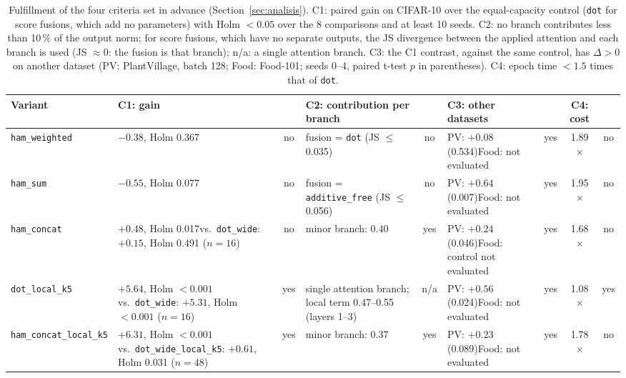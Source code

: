 
\begin{table}[!t]
\centering
\footnotesize
\caption{Fulfillment of the four criteria set in advance (Section~\ref{sec:analisis}). C1: paired gain on CIFAR-10 over the equal-capacity control (\texttt{dot} for score fusions, which add no parameters) with Holm $<0.05$ over the 8 comparisons and at least 10 seeds. C2: no branch contributes less than 10\,\% of the output norm; for score fusions, which have no separate outputs, the JS divergence between the applied attention and each branch is used (JS $\approx0$: the fusion is that branch); n/a: a single attention branch. C3: the C1 contrast, against the same control, has $\Delta>0$ on another dataset (PV: PlantVillage, batch 128; Food: Food-101; seeds 0--4, paired t-test $p$ in parentheses). C4: epoch time $<1.5$ times that of \texttt{dot}.}
\label{tab:criterios}
\begin{adjustbox}{max width=\linewidth}
\begin{tabular}{>{\raggedright\arraybackslash}p{3.25cm}>{\raggedright\arraybackslash}p{3.5cm}c>{\raggedright\arraybackslash}p{2.85cm}c>{\raggedright\arraybackslash}p{3.0cm}ccc}
\toprule
Variant & C1: gain &  & C2: contribution per branch &  & C3: other datasets &  & C4: cost &  \\
\midrule
\texttt{ham\_weighted} & $-0.38$, Holm 0.367 & no & fusion = \texttt{dot} (JS $\leq$0.035) & no & PV: $+0.08$ (0.534)\newline Food: not evaluated & yes & 1.89$\times$ & no \\
\texttt{ham\_sum} & $-0.55$, Holm 0.077 & no & fusion = \texttt{additive\_free} (JS $\leq$0.056) & no & PV: $+0.64$ (0.007)\newline Food: not evaluated & yes & 1.95$\times$ & no \\
\texttt{ham\_concat} & $+0.48$, Holm 0.017\newline vs.\ \texttt{dot\_wide}: $+0.15$, Holm 0.491 ($n=16$) & no & minor branch: 0.40 & yes & PV: $+0.24$ (0.046)\newline Food: control not evaluated & yes & 1.68$\times$ & no \\
\texttt{dot\_local\_k5} & $+5.64$, Holm $<0.001$\newline vs.\ \texttt{dot\_wide}: $+5.31$, Holm $<0.001$ ($n=16$) & yes & single attention branch; local term 0.47--0.55 (layers 1--3) & n/a & PV: $+0.56$ (0.024)\newline Food: not evaluated & yes & 1.08$\times$ & yes \\
\texttt{ham\_concat\_local\_k5} & $+6.31$, Holm $<0.001$\newline vs.\ \texttt{dot\_wide\_local\_k5}: $+0.61$, Holm 0.031 ($n=48$) & yes & minor branch: 0.37 & yes & PV: $+0.23$ (0.089)\newline Food: not evaluated & yes & 1.78$\times$ & no \\
\bottomrule
\end{tabular}
\end{adjustbox}
\end{table}
